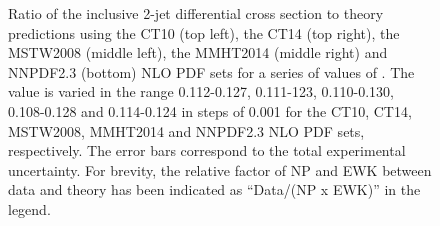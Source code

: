 \begin{figure}[!htbp]
\begin{center}
    \caption{Ratio of the inclusive 2-jet differential cross section to theory predictions using the CT10 (top left), the CT14 (top right),
      the MSTW2008 (middle left), the MMHT2014 (middle right) and NNPDF2.3 (bottom) NLO PDF sets for a 
      series of values of \alpsmz. The \alpsmz value is varied in the range 0.112-0.127, 0.111-123, 0.110-0.130, 0.108-0.128 and 0.114-0.124 in steps of 0.001 for the CT10, CT14, MSTW2008, MMHT2014 and NNPDF2.3 NLO PDF sets, respectively. The error bars correspond to the total experimental uncertainty. For brevity, the relative factor of NP and EWK
      between data and theory has been indicated as ``Data/(NP x EWK)'' in
      the legend.}
    \label{fig:sensitivity_2}
  \end{center}
\end{figure}

